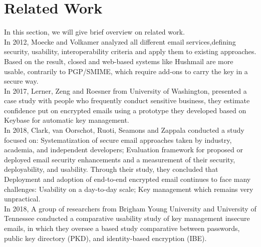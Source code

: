 \section{Related Work}
In this section, we will give brief overview on related work.\\
In 2012, Moecke and Volkamer analyzed all different email services,defining security, usability, interoperability criteria and apply them to existing approaches. Based on the result, closed and web-based systems like Hushmail are more usable, contrarily to PGP/SMIME, which require add-ons to carry the key in a secure way.\cite{usable-secure-email}\\
In 2017, Lerner, Zeng and Roesner from University of Washington, presented a case study with people who frequently conduct sensitive business, they estimate confidence put on encrypted emails using a prototype they developed based on Keybase for automatic key management.\cite{confidente}\\
In 2018, Clark, van Oorschot, Ruoti, Seamons and Zappala conducted a study focused on: Systematization of secure email approaches taken by industry, academia, and independent developers; Evaluation framework for proposed or deployed email security enhancements and a measurement of their security, deployability, and usability. Through their study, they concluded that Deployment and adoption of end-to-end encrypted email continues to face many challenges: Usability on a day-to-day scale; Key management which remains very unpractical.\cite{secure-email}\\
In 2018, A group of researchers from Brigham Young University and University of Tennessee conducted a comparative usability study of key management insecure emails, in which they oversee a based study comparative between passwords, public key directory (PKD), and identity-based encryption (IBE).\cite{comparativestudy}


